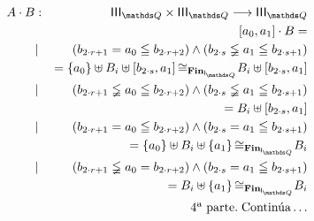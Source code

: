 \documentclass[final,12pt,a4paper,twoside,fleqn]{extbook}
\newcommand{\fromto}{\ensuremath{\longrightarrow}}
\newcommand{\set}[1]{\ensuremath{\left\lbrace{#1}\right\rbrace}}
\theoremstyle{definition}
\theoremstyle{remark}
\begin{document}
\begin{eqnarray}
A \cdot B &:& \IIIQ \times \IIIQ \fromto \IIIQ\\
&&\left[a_0,a_1\right] \cdot B =\\
&|&{ \left( b_{{2 \cdot r} + 1} = a_0 \leqq b_{ {2 \cdot
r} + 2} \right) } \land {\left( b_{2\cdot s} \lneqq a_1 \leqq b_{ 2 \cdot
s + 1} \right) } \\
\qquad&&= \set{a_0} \uplus B_i \uplus \left[b_{2\cdot 
s},a_1\right] {\cong}_{\mathbf{Fin}_{\IQ}} B_i \uplus \left[b_{2\cdot 
s},a_1\right]\\
&|&{ \left( b_{{2 \cdot r} + 1} \lneqq a_0 \leqq b_{ {2 \cdot
r} + 2} \right) } \land {\left( b_{2\cdot s} \lneqq a_1 \leqq b_{ 2 \cdot
s + 1} \right) } \\
\qquad&&= B_i \uplus \left[b_{2\cdot s},a_1\right]\\
&|&{ \left( b_{{2 \cdot r} + 1} = a_0 \leqq b_{ {2 \cdot
r} + 2} \right) } \land {\left( b_{2\cdot s} = a_1 \leqq b_{ 2 \cdot
s + 1} \right) } \\
\qquad&&= \set{a_0} \uplus B_i \uplus \set{a_1} {\cong}_{\mathbf{Fin}_{\IQ}}
B_i\\
&|&{ \left( b_{{2 \cdot r} + 1} \lneqq a_0 = b_{ {2 \cdot
r} + 2} \right) } \land {\left( b_{2\cdot s} = a_1 \leqq b_{ 2 \cdot
s + 1} \right) } \\
\qquad&&= B_i \uplus \set{a_1} {\cong}_{\mathbf{Fin}_{\IQ}}
B_i\\ \nonumber
&&\text{4ª parte.}\;\text{Continúa}\ldots
\end{eqnarray}
\end{document}
